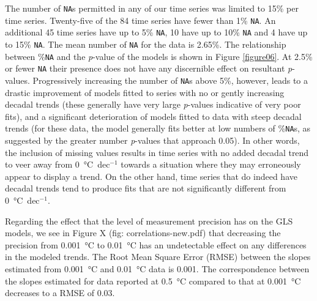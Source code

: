 \documentclass[]{ametsoc}
\begin{document}
The number of \texttt{NA}s permitted in any of our time series was limited to 15\% per time series. Twenty-five of the 84 time series have fewer than 1\% \texttt{NA}. An additional 45 time series have up to 5\% \texttt{NA}, 10 have up to 10\% \texttt{NA} and 4 have up to 15\% \texttt{NA}. The mean number of \texttt{NA} for the data is 2.65\%. The relationship between \%\texttt{NA} and the \emph{p}-value of the models is shown in Figure \ref{figure06}. At 2.5\% or fewer \texttt{NA} their presence does not have any discernible effect on resultant \emph{p}-values. Progressively increasing the number of \texttt{NA}s above 5\%, however, leads to a drastic improvement of models fitted to series with no or gently increasing decadal trends (these generally have very large \emph{p}-values indicative of very poor fits), and a significant deterioration of models fitted to data with steep decadal trends (for these data, the model generally fits better at low numbers of \%\texttt{NA}s, as suggested by the greater number \emph{p}-values that approach 0.05). In other words, the inclusion of missing values results in time series with no added decadal trend to veer away from \SI{0}{\degreeCelsius}~dec$^{-1}$ towards a situation where they may erroneously appear to display a trend. On the other hand, time series that do indeed have decadal trends tend to produce fits that are not significantly different from \SI{0}{\degreeCelsius}~dec$^{-1}$.

Regarding the effect that the level of measurement precision has on the GLS models, we see in Figure X (fig: correlations-new.pdf) that decreasing the precision from \SI{0.001}{\degreeCelsius} to \SI{0.01}{\degreeCelsius} has an undetectable effect on any differences in the modeled trends. The Root Mean Square Error (RMSE) between the slopes estimated from \SI{0.001}{\degreeCelsius} and \SI{0.01}{\degreeCelsius} data is 0.001. The correspondence between the slopes estimated for data reported at \SI{0.5}{\degreeCelsius} compared to that at \SI{0.001}{\degreeCelsius} decreases to a RMSE of 0.03.

\end{document}
